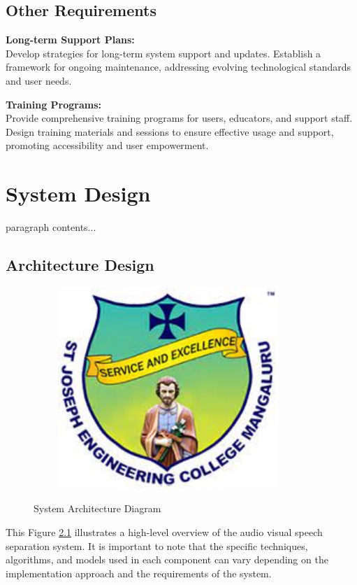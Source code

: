 \documentclass[12pt,a4paper]{report}
\begin{document}
\section{Other Requirements}
\textbf{Long-term Support Plans:}\\
Develop strategies for long-term system support and updates. Establish a framework for ongoing maintenance, addressing evolving technological standards and user needs.

\noindent\textbf{Training Programs:}\\
Provide comprehensive training programs for users, educators, and support staff. Design training materials and sessions to ensure effective usage and support, promoting accessibility and user empowerment.


\chapter{System Design}
paragraph contents... 
\section{Architecture Design}
\begin{figure}[hbtp]
\centering
\includegraphics[width=4in,height=3in]{./pic/sjeclogo.png}
\label{fig:pic1}
\caption{System Architecture Diagram}
\end{figure}
This Figure \ref{fig:pic1} illustrates a high-level overview of the audio visual speech separation system. It is important to note that the specific techniques, algorithms, and models used in each component can vary depending on the implementation approach and the requirements of the system.
\end{document}
